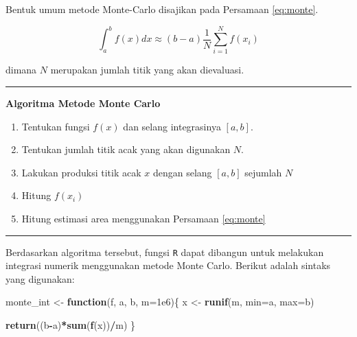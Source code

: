 \documentclass[
]{book}
\newenvironment{Shaded}{\begin{snugshade}}{\end{snugshade}}
\newcommand{\AttributeTok}[1]{\textcolor[rgb]{0.13,0.29,0.53}{#1}}
\newcommand{\ControlFlowTok}[1]{\textcolor[rgb]{0.13,0.29,0.53}{\textbf{#1}}}
\newcommand{\FloatTok}[1]{\textcolor[rgb]{0.00,0.00,0.81}{#1}}
\newcommand{\FunctionTok}[1]{\textcolor[rgb]{0.13,0.29,0.53}{\textbf{#1}}}
\newcommand{\NormalTok}[1]{#1}
\newcommand{\OtherTok}[1]{\textcolor[rgb]{0.56,0.35,0.01}{#1}}
\newcommand{\SpecialCharTok}[1]{\textcolor[rgb]{0.81,0.36,0.00}{\textbf{#1}}}
\providecommand{\tightlist}{%
  \setlength{\itemsep}{0pt}\setlength{\parskip}{0pt}}
\theoremstyle{definition}
\theoremstyle{definition}
\theoremstyle{definition}
\theoremstyle{definition}
\theoremstyle{remark}
\begin{document}
Bentuk umum metode Monte-Carlo disajikan pada Persamaan \eqref{eq:monte}.

\begin{equation}
\int_a^bf\left(x\right)dx\approx\left(b-a\right)\frac{1}{N}\sum_{i=1}^Nf\left(x_i\right)
  \label{eq:monte}
\end{equation}

dimana \(N\) merupakan jumlah titik yang akan dievaluasi.

\begin{center}\rule{0.5\linewidth}{0.5pt}\end{center}

\textbf{Algoritma Metode Monte Carlo}

\begin{enumerate}
\def\labelenumi{\arabic{enumi}.}
\tightlist
\item
  Tentukan fungsi \(f\left(x\right)\) dan selang integrasinya \(\left[a,b\right]\).
\item
  Tentukan jumlah titik acak yang akan digunakan \(N\).
\item
  Lakukan produksi titik acak \(x\) dengan selang \(\left[a,b\right]\) sejumlah \(N\)
\item
  Hitung \(f\left(x_i\right)\)
\item
  Hitung estimasi area menggunakan Persamaan \eqref{eq:monte}
\end{enumerate}

\begin{center}\rule{0.5\linewidth}{0.5pt}\end{center}

Berdasarkan algoritma tersebut, fungsi \texttt{R} dapat dibangun untuk melakukan integrasi numerik menggunakan metode Monte Carlo. Berikut adalah sintaks yang digunakan:

\begin{Shaded}
\begin{Highlighting}[]
\NormalTok{monte\_int }\OtherTok{\textless{}{-}} \ControlFlowTok{function}\NormalTok{(f, a, b, }\AttributeTok{m=}\FloatTok{1e6}\NormalTok{)\{}
\NormalTok{  x }\OtherTok{\textless{}{-}} \FunctionTok{runif}\NormalTok{(m, }\AttributeTok{min=}\NormalTok{a, }\AttributeTok{max=}\NormalTok{b)}
  
  \FunctionTok{return}\NormalTok{((b}\SpecialCharTok{{-}}\NormalTok{a)}\SpecialCharTok{*}\FunctionTok{sum}\NormalTok{(}\FunctionTok{f}\NormalTok{(x))}\SpecialCharTok{/}\NormalTok{m)}
\NormalTok{\}}
\end{Highlighting}
\end{Shaded}
\end{document}
